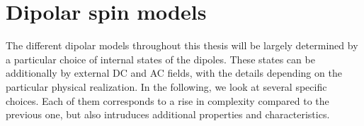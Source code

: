 

\section{Dipolar spin models}
The different dipolar models throughout this thesis will be largely determined by a particular choice of internal states of the dipoles. These states can be additionally  by external DC and AC fields, with the details depending on the particular physical realization.
In the following, we look at several specific choices. Each of them corresponds to a rise in complexity compared to the previous one, but also intruduces additional properties and characteristics.

